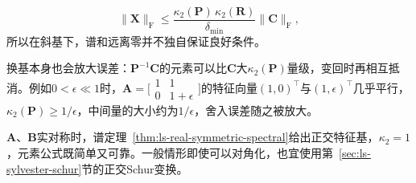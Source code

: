 \begin{equation}
 \lVert\bm X\rVert_{\mathrm F}
 \leq\frac{\kappa_2(\bm P)\,\kappa_2(\bm R)}{\delta_{\min}}\lVert\bm C\rVert_{\mathrm F},
 \label{eq:ls-sylvester-eigenbasis-bound}
\end{equation}
所以在斜基下，谱和远离零并不独自保证良好条件。

换基本身也会放大误差：$\bm P^{-1}\bm C$的元素可以比$\bm C$大$\kappa_2(\bm P)$量级，变回时再相互抵消。例如$0<\epsilon\ll1$时，$\bm A=\bigl[\begin{smallmatrix}1&1\\0&1+\epsilon\end{smallmatrix}\bigr]$的特征向量$(1,0)^\top$与$(1,\epsilon)^\top$几乎平行，$\kappa_2(\bm P)\geq1/\epsilon$，中间量的大小约为$1/\epsilon$，舍入误差随之被放大。

$\bm A$、$\bm B$实对称时，谱定理~\ref{thm:ls-real-symmetric-spectral}给出正交特征基，$\kappa_2=1$，元素公式既简单又可靠。一般情形即使可以对角化，也宜使用第~\ref{sec:ls-sylvester-schur}节的正交Schur变换。
